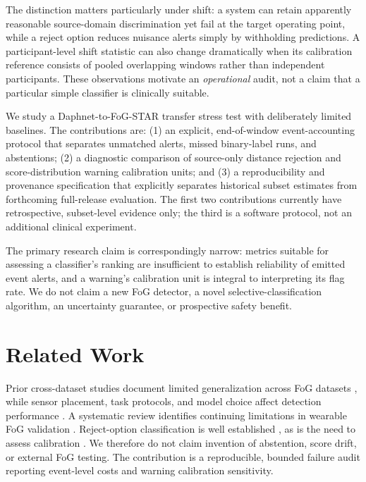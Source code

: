 \documentclass[sigconf,review,anonymous]{acmart}
\begin{document}
The distinction matters particularly under shift: a system can retain apparently reasonable source-domain discrimination yet fail at the target operating point, while a reject option reduces nuisance alerts simply by withholding predictions. A participant-level shift statistic can also change dramatically when its calibration reference consists of pooled overlapping windows rather than independent participants. These observations motivate an \emph{operational} audit, not a claim that a particular simple classifier is clinically suitable.

We study a Daphnet-to-FoG-STAR transfer stress test with deliberately limited baselines. The contributions are: (1) an explicit, end-of-window event-accounting protocol that separates unmatched alerts, missed binary-label runs, and abstentions; (2) a diagnostic comparison of source-only distance rejection and score-distribution warning calibration units; and (3) a reproducibility and provenance specification that explicitly separates historical subset estimates from forthcoming full-release evaluation. The first two contributions currently have retrospective, subset-level evidence only; the third is a software protocol, not an additional clinical experiment.

The primary research claim is correspondingly narrow: metrics suitable for assessing a classifier's ranking are insufficient to establish reliability of emitted event alerts, and a warning's calibration unit is integral to interpreting its flag rate. We do not claim a new FoG detector, a novel selective-classification algorithm, an uncertainty guarantee, or prospective safety benefit.
\section{Related Work}
Prior cross-dataset studies document limited generalization across FoG datasets \cite{sigcha2024cross}, while sensor placement, task protocols, and model choice affect detection performance \cite{borzi2025sensors}. A systematic review identifies continuing limitations in wearable FoG validation \cite{gregorcic2025review}. Reject-option classification is well established \cite{geifman2019}, as is the need to assess calibration \cite{guo2017}. We therefore do not claim invention of abstention, score drift, or external FoG testing. The contribution is a reproducible, bounded failure audit reporting event-level costs and warning calibration sensitivity.
\end{document}
